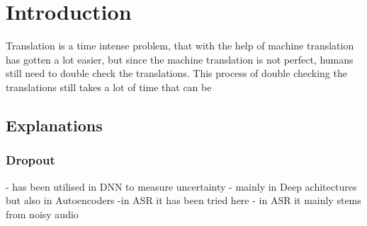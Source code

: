 
\chapter{Introduction}
\label{ch:Introduction}

Translation is a time intense problem, that with the help of machine translation has gotten a lot easier, but since the machine translation is not perfect, humans still need to double check the translations. This process of double checking the translations still takes a lot of time that can be 


\section{Explanations}
\subsection{Dropout}
- has been utilised in DNN to measure uncertainty
- mainly in Deep achitectures but also in Autoencoders \cite{}
-in ASR it has been tried here  \cite{8683086}
- in ASR it mainly stems from noisy audio 
